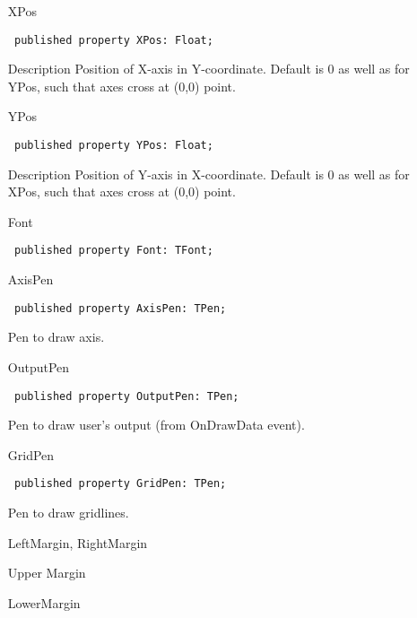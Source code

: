 \documentclass[12pt,a4paper,oneside]{report}
\newcommand{\descriptiontitle}[1]{{\addfontfeatures{FakeSlant}#1}}
\newcommand{\inlineitem}[1]{{\addfontfeatures{FakeBold} #1}}
\newcommand{\code}[1]{\texttt{#1}}
\begin{document}
\begin{itemize}
\item[\inlineitem{XPos}\hfill]
\begin{flushleft}
\code{
published property XPos: Float;}
\end{flushleft}
\label{lmcoordsys.TCoordSys-YPos}
\item[\descriptiontitle{Description}] Position of X-axis in Y-coordinate. Default is 0 as well as for YPos, such that axes cross at (0,0) point.
\item[\inlineitem{YPos}\hfill]
\begin{flushleft}
\code{
published property YPos: Float;}
\end{flushleft}
\item[\descriptiontitle{Description}] Position of Y-axis in X-coordinate. Default is 0 as well as for XPos, such that axes cross at (0,0) point.
\label{lmcoordsys.TCoordSys-Font}
\item[\inlineitem{Font}\hfill]
\begin{flushleft}
\code{
published property Font: TFont;}
\end{flushleft}
\par  \label{lmcoordsys.TCoordSys-AxisPen}
\item[\inlineitem{AxisPen}\hfill]
\begin{flushleft}
\code{
published property AxisPen: TPen;}
\end{flushleft}
\par Pen to draw axis.\label{lmcoordsys.TCoordSys-OutputPen}
\item[\inlineitem{OutputPen}\hfill]
\begin{flushleft}
\code{
published property OutputPen: TPen;}
\end{flushleft}
\par Pen to draw user's output (from OnDrawData event).\label{lmcoordsys.TCoordSys-GridPen}
\item[\inlineitem{GridPen}\hfill]
\begin{flushleft}
\code{
published property GridPen: TPen;}
\end{flushleft}
Pen to draw gridlines.
\label{lmcoordsys.TCoordSys-LeftMargin}\label{lmcoordsys.TCoordSys-RightMargin}
\item[\inlineitem{LeftMargin, RightMargin}\hfill]
\item[\inlineitem{Upper Margin}\hfill]
\item[\inlineitem{LowerMargin}\hfill]
\begin{flushleft}

\end{flushleft}
\end{itemize}
\end{document}
